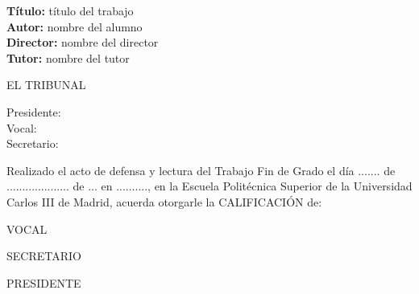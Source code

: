 \cleardoublepage

\begin{flushleft} \large
\textbf{Título:} título del trabajo \\
\textbf{Autor:} nombre del alumno\\
\textbf{Director:} nombre del director \\ 
\textbf{Tutor:} nombre del tutor\\ [1 cm]

\end{flushleft} 

\begin{center} \LARGE
EL TRIBUNAL \\ [1 cm]
\end{center}

\begin{flushleft} \LARGE
Presidente: \\ [1 cm]
Vocal: \\ [1 cm]
Secretario: \\ [1.5 cm]
\end{flushleft}

{\large
Realizado el acto de defensa y lectura del Trabajo Fin de Grado el día ....... de ....................   de ... en .........., en la Escuela Politécnica Superior de la Universidad Carlos III de Madrid, acuerda otorgarle la CALIFICACIÓN de:} \\ [2 cm]

\begin{center}
 \large VOCAL \\ [2.2 cm]
\end{center}

\begin{minipage}{0.5\textwidth}
 \begin{flushleft}
 \large SECRETARIO
\end{flushleft}
\end{minipage}
\begin{minipage}{0.5\textwidth}
\begin{flushright}
 \large PRESIDENTE
\end{flushright} 
\end{minipage}
